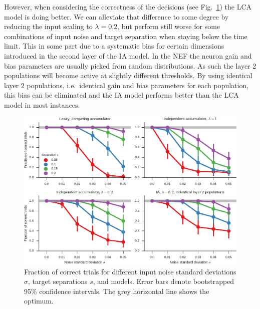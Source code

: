 \documentclass[10pt,letterpaper]{article}
\begin{document}
However, when considering the correctness of the decisions (see Fig.~\ref{fig:correct}) the LCA model is doing better.
We can alleviate that difference to some degree by reducing the input scaling to $\lambda = 0.2$, but perform still worse for some combinations of input noise and target separation when staying below the time limit.
This in some part due to a systematic bias for certain dimensions introduced in the second layer of the IA model.
In the NEF the neuron gain and bias parameters are usually picked from random distributions.
As such the layer 2 populations will become active at slightly different thresholds.
By using identical layer 2 populations, i.e.~identical gain and bias parameters for each population, this bias can be eliminated and the IA model performs better than the LCA model in most instances.
\begin{figure}
    \centering
    \includegraphics{figures/correct}
    \caption{Fraction of correct trials for different input noise standard 
        deviations $\sigma$, target separations $s$, and models.  Error bars 
        denote bootstrapped 95\% confidence intervals. The grey horizontal line 
        shows the optimum.}\label{fig:correct}
\end{figure}
\end{document}
